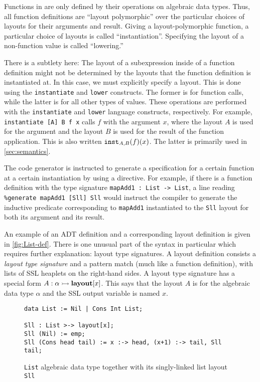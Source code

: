 Functions in \Pika{} are only defined by their operations on algebraic
data types. Thus, all function definitions are ``layout polymorphic''
over the particular choices of layouts for their arguments and result.
Giving a layout-polymorphic function, a particular choice of layouts
is called ``instantiation''. Specifying the layout of a non-function
value is called ``lowering.''

There is a subtlety here: The layout of a subexpression inside of a
function definition might not be determined by the layouts that the
function definition is instantiated at. In this case, we must
explicitly specify a layout. This is done using the \verb|instantiate|
and \verb|lower| constructs. The former is for function calls, while
the latter is for all other types of values. These operations are
performed with the \verb|instantiate| and \verb|lower| language
constructs, respectively. For example, \verb|instantiate [A] B f x|
calls $f$ with the argument $x$, where the layout $A$ is used for the
argument and the layout $B$ is used for the result of the function
application. This is also written $\texttt{inst}_{A,B}(f)(x)$. The
latter is primarily used in \autoref{sec:semantics}.

The code generator is instructed to generate a \SuSLik{} specification
for a certain function at a certain instantiation by using a
\generate{} directive. For example, if there is a function definition
with the type signature \verb|mapAdd1 : List -> List|, a line reading
\verb|%generate mapAdd1 [Sll] Sll| would instruct the
\Pika{} compiler to generate the \SuSLik{} inductive predicate
corresponding to \verb|mapAdd1| instantiated to the \verb|Sll| layout
for both its argument and its result.

An example of an ADT definition and a corresponding layout definition
is given in \autoref{fig:List-def}. There is one unusual part of
the syntax in particular which requires further explanation: layout
type signatures. A layout definition consists a \textit{layout type
  signature} and a pattern match (much like a function definition),
with lists of SSL heaplets on the right-hand sides. A layout type
signature has a special form $A : \alpha \rightarrowtail \textbf{layout}[x]$. This says
that the layout $A$ is for the algebraic data type $\alpha$ and the
SSL output variable is named $x$.

\begin{figure}[t]
\begin{lstlisting}
data List := Nil | Cons Int List;

Sll : List >-> layout[x];
Sll (Nil) := emp;
Sll (Cons head tail) := x :-> head, (x+1) :-> tail, Sll tail;
\end{lstlisting}
  \caption{\lstinline{List} algebraic data type together with its singly-linked list layout \lstinline{Sll}}
  \label{fig:List-def}
\end{figure}

